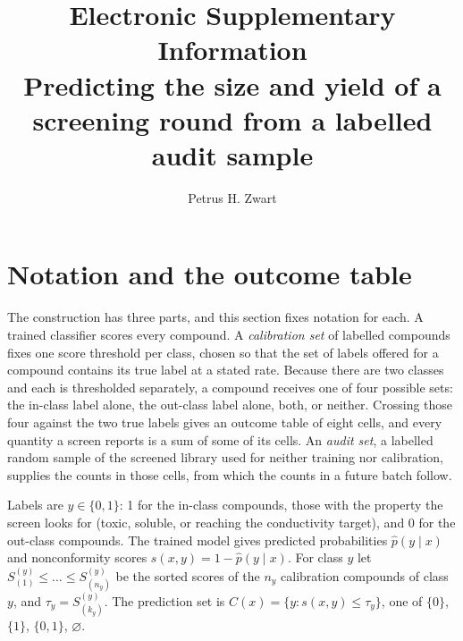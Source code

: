 \documentclass[10pt]{article}
\title{\bfseries Electronic Supplementary Information\\[4pt]
\large Predicting the size and yield of a screening round from a labelled audit sample}
\author{Petrus H. Zwart}
\date{}
\begin{document}
\maketitle
\tableofcontents

\section{Notation and the outcome table}
\label{sec:notation}

The construction has three parts, and this section fixes notation for each. A trained
classifier scores every compound. A \emph{calibration set} of labelled compounds fixes one
score threshold per class, chosen so that the set of labels offered for a compound contains
its true label at a stated rate. Because there are two classes and each is thresholded
separately, a compound receives one of four possible sets: the in-class label alone, the
out-class label alone, both, or neither. Crossing those four against the two true labels
gives an outcome table of eight cells, and every quantity a screen reports is a sum of some
of its cells. An \emph{audit set}, a labelled random sample of the screened library used for
neither training nor calibration, supplies the counts in those cells, from which the counts
in a future batch follow.

Labels are $y\in\{0,1\}$: 1 for the in-class compounds, those with the property the screen looks for (toxic, soluble, or reaching the conductivity target), and 0 for the out-class compounds. The trained model gives predicted probabilities $\hat p(y\mid x)$ and nonconformity scores $s(x,y)=1-\hat p(y\mid x)$. For class $y$ let $S^{(y)}_{(1)}\le\dots\le S^{(y)}_{(n_y)}$ be the sorted scores of the $n_y$ calibration compounds of class $y$, and $\tau_y=S^{(y)}_{(k_y)}$. The prediction set is $C(x)=\{y: s(x,y)\le\tau_y\}$, one of $\{0\}$, $\{1\}$, $\{0,1\}$, $\varnothing$.
\end{document}
